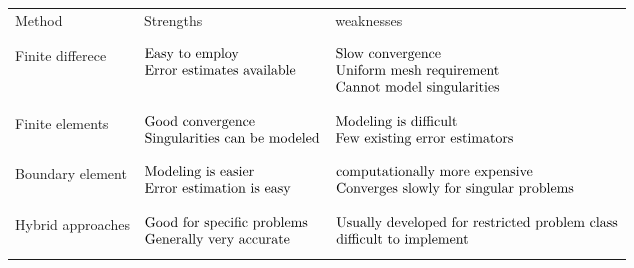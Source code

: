 \documentclass[11pt]{article}
\begin{document}
\begin{center}
    \begin{tabular}{ l l l } 
     \hline
    Method             & Strengths &weaknesses\\\\ \hline
    \\Finite differece   & $\begin{array}{@{}l@{}} \text{Easy to employ}\\\text{Error estimates available} \end{array}$& $\begin{array}{@{}l@{}} \text{Slow convergence}\\\text{Uniform mesh requirement} \\\text{Cannot model singularities}\end{array}$ \\\\\hline
    \\Finite elements    & $\begin{array}{@{}l@{}} \text{Good convergence}\\\text{Singularities can be modeled} \end{array}$ &  $\begin{array}{@{}l@{}} \text{Modeling is difficult}\\\text{Few existing error estimators} \end{array}$ \\\\\hline
    \\Boundary element   & $\begin{array}{@{}l@{}} \text{Modeling is easier}\\\text{Error estimation is easy} \end{array}$ &$\begin{array}{@{}l@{}} \text{computationally more expensive }\\\text{Converges slowly for singular problems} \end{array}$\\\\\hline
    \\Hybrid approaches  & $\begin{array}{@{}l@{}} \text{Good for specific problems}\\\text{Generally very accurate} \end{array}$& $\begin{array}{@{}l@{}} \text{Usually developed for restricted problem class}\\\text{difficult to implement} \end{array}$\\ 
     \\\hline
    \end{tabular}
\end{center}
\end{document}
